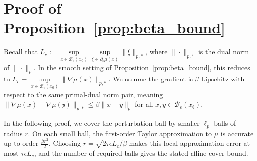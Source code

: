 \documentclass{article}
\theoremstyle{definition}
\begin{document}
\section{Proof of Proposition~\ref{prop:beta_bound}}\label{app:Proofs}

Recall that
$L_c := \sup\limits_{x\in \mathcal{B}_\epsilon(x_0)}
\sup\limits_{\xi\in \partial_c \mu(x)} \|\xi\|_{p,*}$, where $\|\cdot\|_{p,*}$ is the dual norm of $\|\cdot\|_p$. In the smooth setting of Proposition~\ref{prop:beta_bound}, this reduces to
$L_c=\sup\limits_{x\in\mathcal{B}_\epsilon(x_0)}\|\nabla\mu(x)\|_{p,*}$. We assume the gradient is $\beta$-Lipschitz with respect to the same primal-dual norm pair, meaning
$\|\nabla\mu(x)-\nabla\mu(y)\|_{p,*}\leq \beta\|x-y\|_p$ for all
$x,y\in\mathcal{B}_\epsilon(x_0)$.

In the following proof, we cover the perturbation ball by smaller $\ell_p$ balls of radius $r$. On each small ball, the first-order Taylor approximation to $\mu$ is accurate up to order $\frac{\beta r^2}{2}$. Choosing $r=\sqrt{2\tau\epsilon L_c/\beta}$ makes this local approximation error at most $\tau\epsilon L_c$, and the number of required balls gives the stated affine-cover bound.
\end{document}
